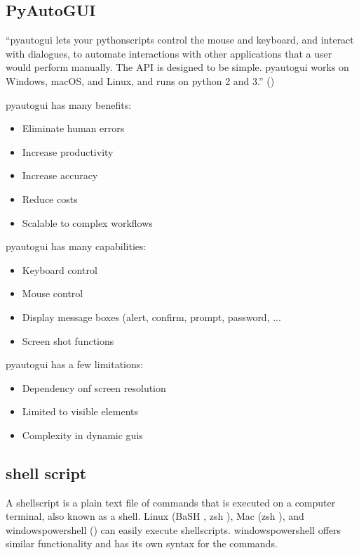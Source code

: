 \documentclass[10pt, letterpaper, twoside]{article}
\begin{document}
\subsection{PyAutoGUI}\label{sec:pyautogui}
\enquote{\Gls{pyautogui} lets your \glspl{pythonscript} control the mouse and keyboard,  and interact with dialogues, to automate interactions with other applications that a user would perform manually. The API is designed to be simple. \Gls{pyautogui} works on Windows, macOS, and Linux, and runs on \Gls{python} 2 and 3.} (\cite{pyautogui})

\Gls{pyautogui} has many benefits:
\begin{itemize}
    \item{Eliminate human errors}
    \item{Increase productivity}
    \item{Increase accuracy}
    \item{Reduce costs}
    \item{Scalable to complex workflows}
\end{itemize}
\Gls{pyautogui} has many capabilities:
\begin{itemize}
    \item{Keyboard control}
    \item{Mouse control}
    \item{Display message boxes (alert, confirm, prompt, password, ...}
    \item{Screen shot functions}
\end{itemize}

\Gls{pyautogui} has a few limitations:
\begin{itemize}
    \item{Dependency onf screen resolution}
    \item{Limited to visible elements}
    \item{Complexity in dynamic \glspl{gui}}
\end{itemize}

\subsection{shell script}\label{sec:shell_script}
A \gls{shellscript} is a plain text file of commands that is executed on a computer terminal, also known as a shell. Linux (BaSH \cite{bash}, zsh \cite{zsh}), Mac (zsh \cite{zsh}), and \Gls{windowspowershell} (\cite{windowspowershell}) can easily execute \glspl{shellscript}. \Gls{windowspowershell} offers similar functionality and has its own syntax for the commands.
\end{document}
